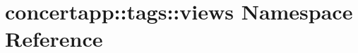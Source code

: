 \hypertarget{namespaceconcertapp_1_1tags_1_1views}{
\section{concertapp::tags::views Namespace Reference}
\label{namespaceconcertapp_1_1tags_1_1views}
}
